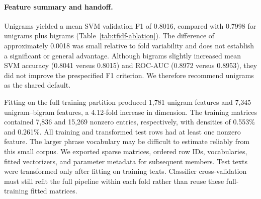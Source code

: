 \begin{table}[t]
  \caption{Training-only five-fold feature comparison. Values are mean
  positive-class F1 and sample standard deviation across folds, not
  confidence intervals. No test-set performance is reported.}
  \label{tab:tfidf-ablation}
  \centering
\end{table}

\paragraph{Feature summary and handoff.}
Unigrams yielded a mean SVM validation F1 of 0.8016, compared with
0.7998 for unigrams plus bigrams (Table~\ref{tab:tfidf-ablation}).
The difference of approximately 0.0018 was small relative to fold
variability and does not establish a significant or general advantage.
Although bigrams slightly increased mean SVM accuracy
(0.8041 versus 0.8015) and ROC-AUC (0.8972 versus 0.8953),
they did not improve the prespecified F1 criterion.
We therefore recommend unigrams as the shared default.

Fitting on the full training partition produced 1,781 unigram features
and 7,345 unigram--bigram features, a 4.12-fold increase in dimension.
The training matrices contained 7,836 and 15,269 nonzero entries,
respectively, with densities of 0.553\% and 0.261\%.
All training and transformed test rows had at least one nonzero feature.
The larger phrase vocabulary may be difficult to estimate reliably
from this small corpus. We exported sparse matrices, ordered row IDs,
vocabularies, fitted vectorizers, and parameter metadata for subsequent
members. Test texts were transformed only after fitting on training
texts. Classifier cross-validation must still refit the full pipeline
within each fold rather than reuse these full-training fitted matrices.
